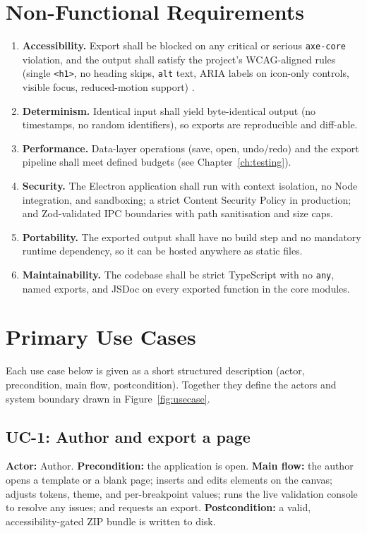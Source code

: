 \section{Non-Functional Requirements}
\begin{enumerate}[label=\textbf{NFR\arabic*.}, leftmargin=3.8em]
  \item \textbf{Accessibility.} Export shall be blocked on any critical or serious
        \texttt{axe-core} violation, and the output shall satisfy the project's
        WCAG-aligned rules (single \texttt{<h1>}, no heading skips, \texttt{alt}
        text, ARIA labels on icon-only controls, visible focus, reduced-motion
        support) \cite{wcag21}.
  \item \textbf{Determinism.} Identical input shall yield byte-identical output
        (no timestamps, no random identifiers), so exports are reproducible and
        diff-able.
  \item \textbf{Performance.} Data-layer operations (save, open, undo/redo) and the
        export pipeline shall meet defined budgets (see
        Chapter~\ref{ch:testing}).
  \item \textbf{Security.} The Electron application shall run with context
        isolation, no Node integration, and sandboxing; a strict Content Security
        Policy in production; and Zod-validated IPC boundaries with path
        sanitisation and size caps.
  \item \textbf{Portability.} The exported output shall have no build step and no
        mandatory runtime dependency, so it can be hosted anywhere as static files.
  \item \textbf{Maintainability.} The codebase shall be strict TypeScript with no
        \texttt{any}, named exports, and JSDoc on every exported function in the
        core modules.
\end{enumerate}

\section{Primary Use Cases}
Each use case below is given as a short structured description (actor,
precondition, main flow, postcondition). Together they define the actors and
system boundary drawn in Figure~\ref{fig:usecase}.

\subsection*{UC-1: Author and export a page}
\textbf{Actor:} Author. \quad\textbf{Precondition:} the application is open.
\textbf{Main flow:} the author opens a template or a blank page; inserts and edits
elements on the canvas; adjusts tokens, theme, and per-breakpoint values; runs the
live validation console to resolve any issues; and requests an export.
\textbf{Postcondition:} a valid, accessibility-gated ZIP bundle is written to disk.

